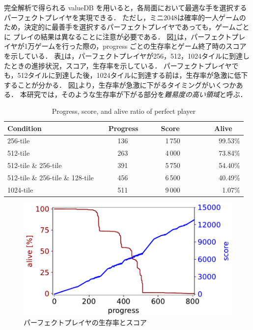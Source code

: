 完全解析で得られる valueDB を用いると，各局面において最適な手を選択するパーフェクトプレイヤを実現できる．
ただし，ミニ2048は確率的一人ゲームのため，決定的に最善手を選択するパーフェクトプレイヤであっても，ゲームごとに
プレイの結果は異なることに注意が必要である．
図\ref{pp-play}は，パーフェクトプレイヤが1万ゲームを行った際の，progress ごとの生存率とゲーム終了時のスコアを示している．
表\ref{pp-specific}は，パーフェクトプレイヤが256，512，1024タイルに到達したときの進捗状況，スコア，生存率を示している．
パーフェクトプレイヤでも，512タイルに到達した後，1024タイルに到達する前は，生存率が急激に低下することが分かる．
図\ref{pp-play}より，生存率が急激に下がるタイミングがいくつかある．
本研究では，そのような生存率が下がる部分を\emph{難易度の高い領域}と呼ぶ．
\begin{table}[t]
  \caption{Progress, score, and alive ratio of perfect player}
  \label{pp-specific}
  \centering\begin{tabular}{lrrr}
   \hline\hline
   Condition & ~~Progress & ~~~~Score~ & ~~~~~~Alive~~ \\
   \hline
  256-tile                          & 136~~~ & 1\,750~ & 99.53\% \\
  512-tile                          & 263~~~ & 4\,000~ & 73.84\% \\
  512-tile \& 256-tile              & 391~~~ & 5\,750~ & 54.40\% \\
  512-tile \& 256-tile \& 128-tile  & 456~~~ & 6\,500~ & 40.49\% \\
  1024-tile                         & 511~~~ & 9\,000~ &  1.07\% \\
   \hline
\end{tabular}
\end{table}

\begin{figure}[t]
  \centering\includegraphics[width=\linewidth]{pdf/pp-play.pdf}
  \caption{パーフェクトプレイヤの生存率とスコア \cite{TeKM23}}
  \label{pp-play}
\end{figure}


